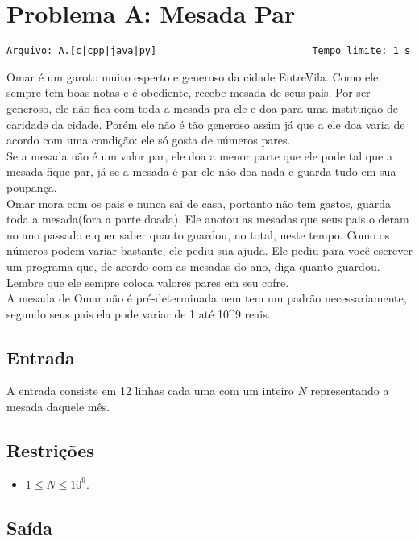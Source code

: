 \section{Problema A: Mesada Par}
\vspace{-0.52cm}
\noindent \begin{verbatim}Arquivo: A.[c|cpp|java|py]                           Tempo limite: 1 s
\end{verbatim}

Omar é um garoto muito esperto e generoso da cidade EntreVila. Como ele sempre tem boas notas e é obediente, recebe mesada de seus pais. Por ser generoso, ele não fica com toda a mesada pra ele e doa para uma instituição de caridade da cidade. Porém ele não é tão generoso assim já que a ele doa varia de acordo com uma condição: ele só gosta de números pares. \\
Se a mesada não é um valor par, ele doa a menor parte que ele pode tal que a mesada fique par, já se a mesada é par ele não doa nada e guarda tudo em sua poupança. \\
Omar mora com os pais e nunca sai de casa, portanto não tem gastos, guarda toda a mesada(fora a parte doada). Ele anotou as mesadas que seus pais o deram no ano passado e quer saber quanto guardou, no total, neste tempo. Como os números podem variar bastante, ele pediu sua ajuda. Ele pediu para você escrever um programa que, de acordo com as mesadas do ano, diga quanto guardou. Lembre que ele sempre coloca valores pares em seu cofre.\\

A mesada de Omar não é pré-determinada nem tem um padrão necessariamente, segundo seus pais ela pode variar de 1 até 10^{9} reais.

\subsection*{Entrada}

A entrada consiste em 12 linhas cada uma com um inteiro $N$ representando a mesada daquele mês.

\subsection*{Restrições}
\begin{itemize}
    \item $1 \le N \le 10^{9}$.
\end{itemize}

\subsection*{Saída}

